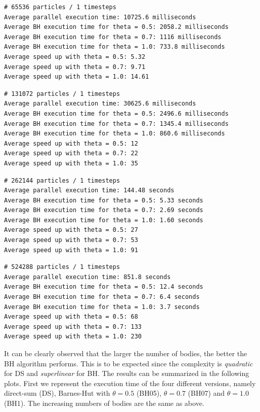 \documentclass{article}
\begin{document}
\begin{boxA}
    \begin{verbatim}
# 65536 particles / 1 timesteps
Average parallel execution time: 10725.6 milliseconds
Average BH execution time for theta = 0.5: 2058.2 milliseconds
Average BH execution time for theta = 0.7: 1116 milliseconds
Average BH execution time for theta = 1.0: 733.8 milliseconds
Average speed up with theta = 0.5: 5.32
Average speed up with theta = 0.7: 9.71
Average speed up with theta = 1.0: 14.61
\end{verbatim}
\end{boxA}

\begin{boxA}
    \begin{verbatim}
# 131072 particles / 1 timesteps
Average parallel execution time: 30625.6 milliseconds
Average BH execution time for theta = 0.5: 2496.6 milliseconds
Average BH execution time for theta = 0.7: 1345.4 milliseconds
Average BH execution time for theta = 1.0: 860.6 milliseconds
Average speed up with theta = 0.5: 12
Average speed up with theta = 0.7: 22
Average speed up with theta = 1.0: 35
\end{verbatim}
\end{boxA}

\begin{boxA}
    \begin{verbatim}
# 262144 particles / 1 timesteps
Average parallel execution time: 144.48 seconds
Average BH execution time for theta = 0.5: 5.33 seconds
Average BH execution time for theta = 0.7: 2.69 seconds
Average BH execution time for theta = 1.0: 1.60 seconds
Average speed up with theta = 0.5: 27
Average speed up with theta = 0.7: 53
Average speed up with theta = 1.0: 91
\end{verbatim}
\end{boxA}

\begin{boxA}
    \begin{verbatim}
# 524288 particles / 1 timesteps
Average parallel execution time: 851.8 seconds
Average BH execution time for theta = 0.5: 12.4 seconds
Average BH execution time for theta = 0.7: 6.4 seconds
Average BH execution time for theta = 1.0: 3.7 seconds
Average speed up with theta = 0.5: 68
Average speed up with theta = 0.7: 133
Average speed up with theta = 1.0: 230
    \end{verbatim}
\end{boxA}

\noindent It can be clearly observed that the larger the number of bodies, the better the BH algorithm performs. This is to be expected since the complexity is \textit{quadratic} for DS and \textit{superlinear} for BH. The results can be summarized in the following plots. First we represent the execution time of the four different versions, namely direct-sum (DS), Barnes-Hut with $\theta = 0.5$ (BH05), $\theta = 0.7$ (BH07) and $\theta = 1.0$ (BH1). The increasing numbers of bodies are the same as above. \\
\end{document}
